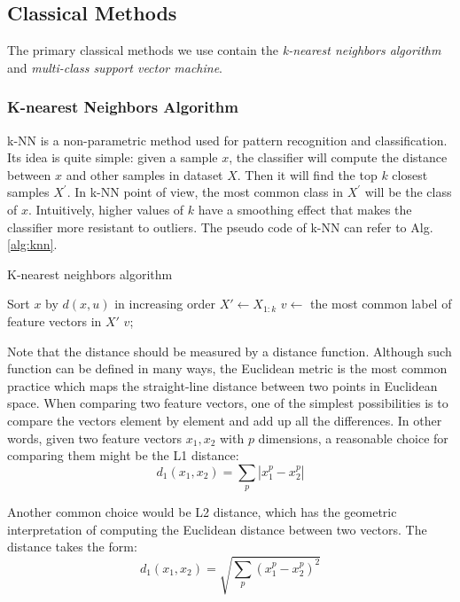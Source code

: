 \documentclass[10pt,twocolumn,letterpaper]{article}
\begin{document}
\subsection{Classical Methods}
	The primary classical methods we use contain the \emph{k-nearest neighbors algorithm} and \emph{multi-class support vector machine}.

\subsubsection{K-nearest Neighbors Algorithm}
	k-NN is a non-parametric method used for pattern recognition and classification. Its idea is quite simple: given a sample $x$, the classifier will compute the distance between $x$ and other samples in dataset $X$. Then it will find the top $k$ closest samples $X^{'}$. In k-NN point of view, the most common class in $X^{'}$ will be the class of $x$. Intuitively, higher values of $k$ have a smoothing effect that makes the classifier more resistant to outliers. The pseudo code of k-NN can refer to Alg. \ref{alg:knn}.
	
\begin{algorithm}[htbp]
	\caption{K-nearest neighbors algorithm}\label{alg:knn}
	\vspace{0.25\baselineskip}
	\BlankLine
	Sort $x$ by $d(x, u)$ in increasing order\;
	$X' \leftarrow X_{1:k}$\;
	$v \leftarrow$ the most common label of feature vectors in $X'$\;
	\Return $v$;
\end{algorithm}
\BlankLine
	
	Note that the distance should be measured by a distance function. Although such function can be defined in many ways, the Euclidean metric is the most common practice which maps the straight-line distance between two points in Euclidean space. When comparing two feature vectors, one of the simplest possibilities is to compare the vectors element by element and add up all the differences. In other words, given two feature vectors $x_1, x_2$ with $p$ dimensions, a reasonable choice for comparing them might be the L1 distance:
\begin{equation}
	d_1(x_1, x_2) = \sum_p \left|x_1^p - x_2^p\right| \label{eq:l1}
\end{equation}

	Another common choice would be L2 distance, which has the geometric interpretation of computing the Euclidean distance between two vectors. The distance takes the form:
\begin{equation}
	d_1(x_1, x_2) = \sqrt{\sum_p {\left(x_1^p - x_2^p\right)}^2} \label{eq:l2}
\end{equation}
	
\end{document}
